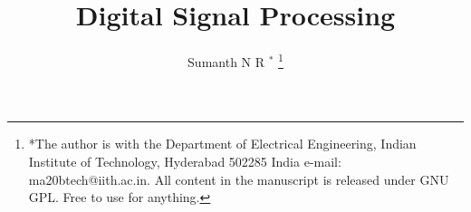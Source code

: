 \documentclass[journal,12pt,twocolumn]{IEEEtran}
\begin{document}
\let\StandardTheFigure\thefigure
\renewcommand{\thefigure}{\theproblem}



\def\putbox#1#2#3{\makebox[0in][l]{\makebox[#1][l]{}\raisebox{\baselineskip}[0in][0in]{\raisebox{#2}[0in][0in]{#3}}}}
     \def\rightbox#1{\makebox[0in][r]{#1}}
     \def\centbox#1{\makebox[0in]{#1}}
     \def\topbox#1{\raisebox{-\baselineskip}[0in][0in]{#1}}
     \def\midbox#1{\raisebox{-0.5\baselineskip}[0in][0in]{#1}}

\vspace{3cm}

\title{ 
Digital Signal Processing
}


%
%
%

\author{ Sumanth N R $^{*}$ %
\thanks{*The author is with the Department
of Electrical Engineering, Indian Institute of Technology, Hyderabad
502285 India e-mail:  ma20btech@iith.ac.in.  All content in the manuscript is 
released under GNU GPL.  Free to use for anything. }%
}
% 
%
\end{document}
